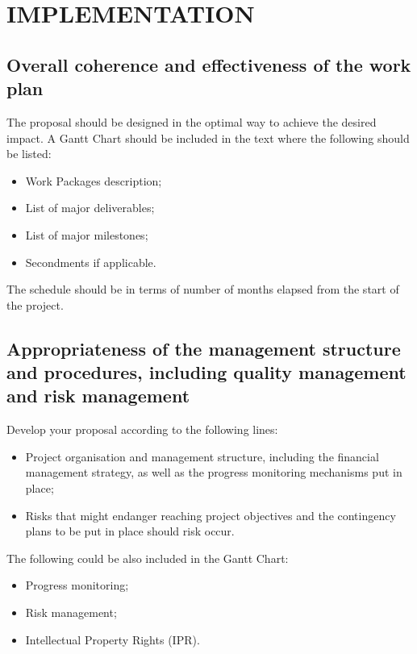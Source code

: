 \section{IMPLEMENTATION}
\label{sec:implementation}

\subsection{Overall coherence and effectiveness of the work plan}

The proposal should be designed in the optimal way to achieve the desired impact. A Gantt Chart should be included in the text where the following should be listed:
\begin{itemize}
\item Work Packages description;
\item List of major deliverables;
\item List of major milestones;
\item Secondments if applicable.
\end{itemize}

The schedule should be in terms of number of months elapsed from the start of the project.

\subsection{Appropriateness of the management structure and procedures, including quality management and risk management}

Develop your proposal according to the following lines:
\begin{itemize}
\item Project organisation and management structure, including the financial management strategy, as well as the progress monitoring mechanisms put in place;
\item Risks that might endanger reaching project objectives and the contingency plans to be put in place should risk occur.
\end{itemize}
The following could be also included in the Gantt Chart:
\begin{itemize}
\item Progress monitoring;
\item Risk management;
\item Intellectual Property Rights (IPR).
\end{itemize}

